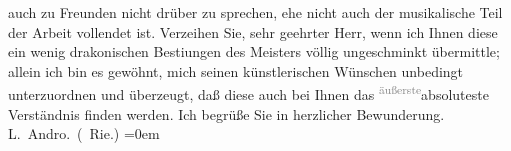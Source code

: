 \begin{ledgroupsized}[t]{13cm}
               auch zu Freunden nicht drüber zu sprechen, ehe nicht auch der musikalische Teil der
               Arbeit vollendet ist.\pend
           \pstart
           Verzeihen Sie, sehr geehrter Herr, wenn ich Ihnen diese ein wenig drakonischen
                  Besti{\geminationm}ungen des Meisters völlig ungeschminkt übermittle; allein ich bin es
               gewöhnt, mich seinen künstlerischen Wünschen unbedingt unterzuordnen und überzeugt,
               daß diese auch bei Ihnen das {\pb}\substVorne{}\textsuperscript{\textcolor{gray}{äußerste}}{\allowbreak}\substDazwischen{}absoluteste\substHinten{} Verständnis finden werden.\pend
           \pstart
           Ich begrüße Sie in herzlicher Bewunderung.{\\[\baselineskip]}\spacefill\mbox{L. Andro. (\label{K_L02569-1v}\label{K_L02569-1h} Rie.)}\pend
           \leftskip=0em{}
         
         \endnumbering{}\end{ledgroupsized}  \newcommand{\dateiname}{L02569}\newcommand{\titel}{Therese Rie-Andro an Arthur Schnitzler, 6. 2. 1912}\newcommand{\editorInnen}{Martin Anton Müller und Gerd-Hermann Susen}
      